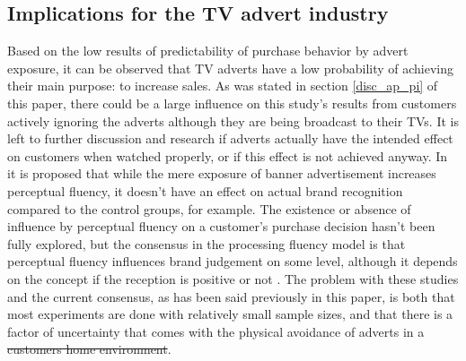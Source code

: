 \documentclass[review]{elsarticle}
\providecommand{\DIFaddtex}[1]{{\protect\color{blue}\uwave{#1}}} %
\providecommand{\DIFdeltex}[1]{{\protect\color{red}\sout{#1}}}                      %
\providecommand{\DIFaddbegin}{} %
\providecommand{\DIFaddend}{} %
\providecommand{\DIFdelbegin}{} %
\providecommand{\DIFdelend}{} %
\providecommand{\DIFadd}[1]{\texorpdfstring{\DIFaddtex{#1}}{#1}} %
\providecommand{\DIFdel}[1]{\texorpdfstring{\DIFdeltex{#1}}{}} %
\newcommand{\DIFscaledelfig}{0.5}
\newlength{\DIFdelgraphicswidth} %
\newlength{\DIFdelgraphicsheight} %
\newcommand{\DIFaddincludegraphics}[2][]{{\color{blue}\fbox{\DIFOincludegraphics[#1]{#2}}}} %
\newcommand{\DIFdelincludegraphics}[2][]{%
\sbox{\DIFdelgraphicsbox}{\DIFOincludegraphics[#1]{#2}}%
\settoboxwidth{\DIFdelgraphicswidth}{\DIFdelgraphicsbox} %
\settoboxtotalheight{\DIFdelgraphicsheight}{\DIFdelgraphicsbox} %
\scalebox{\DIFscaledelfig}{%
\parbox[b]{\DIFdelgraphicswidth}{\usebox{\DIFdelgraphicsbox}\\[-\baselineskip] \rule{\DIFdelgraphicswidth}{0em}}\llap{\resizebox{\DIFdelgraphicswidth}{\DIFdelgraphicsheight}{%
\setlength{\unitlength}{\DIFdelgraphicswidth}%
\begin{picture}(1,1)%
\thicklines\linethickness{2pt} %
{\color[rgb]{1,0,0}\put(0,0){\framebox(1,1){}}}%
{\color[rgb]{1,0,0}\put(0,0){\line( 1,1){1}}}%
{\color[rgb]{1,0,0}\put(0,1){\line(1,-1){1}}}%
\end{picture}%
}\hspace*{3pt}}} %
} %
\DeclareRobustCommand{\DIFaddbegin}{\DIFOaddbegin \let\includegraphics\DIFaddincludegraphics} %
\DeclareRobustCommand{\DIFaddend}{\DIFOaddend \let\includegraphics\DIFOincludegraphics} %
\DeclareRobustCommand{\DIFdelbegin}{\DIFOdelbegin \let\includegraphics\DIFdelincludegraphics} %
\DeclareRobustCommand{\DIFdelend}{\DIFOaddend \let\includegraphics\DIFOincludegraphics} %
\begin{document}
\subsection{Implications for the TV advert industry}
\label{disc_advert}

Based on the low results of predictability of purchase behavior by advert exposure, it can be observed that TV adverts have a low probability of achieving their main purpose: to increase sales. As was stated in section \ref{disc_ap_pi} of this paper, there could be a large influence on this study's results from customers actively ignoring the adverts although they are being broadcast to their TVs. It is left to further discussion and research if adverts actually have the intended effect on customers when watched properly, or if this effect is not achieved anyway. In \cite{fang} it is proposed that while the mere exposure of banner advertisement increases perceptual fluency, it doesn't have an effect on actual brand recognition compared to the control groups, for example. The existence or absence of influence by perceptual fluency on a customer's purchase decision hasn't been fully explored, but the consensus in the processing fluency model is that perceptual fluency influences brand judgement on some level, although it depends on the concept if the reception is positive or not \cite{lee-a}. The problem with these studies and the current consensus, as has been said previously in this paper, is both that most experiments are done with relatively small sample sizes, and that there is a factor of uncertainty that comes with the physical avoidance of adverts in a \DIFdelbegin \DIFdel{customers home environment}\DIFdelend \DIFaddbegin \DIFadd{customer's household}\DIFaddend .
\end{document}
